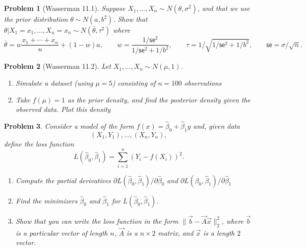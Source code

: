 \documentclass{article}
\newtheorem{problem}{Problem}
\begin{document}
\begin{problem}[Wasserman 11.1]
    Suppose $X_1, \ldots, X_n \sim N(\theta,\sigma^2)$, and that we use the prior distribution $\theta\sim N(a,b^2)$.
    Show that $\theta|X_1=x_1, \ldots, X_n=x_n \sim N(\bar{\theta},\tau^2)$ where 
    \begin{equation*}
        \bar{\theta} = w \frac{x_1+ \cdots + x_n}{n} + (1-w)a
        ,\qquad w = \frac{1/\mathsf{se}^2}{1/\mathsf{se}^2 + 1/b^2}
        ,\qquad \tau = 1/\sqrt{1/\mathsf{se}^2 + 1/b^2}
        ,\qquad \mathsf{se} = \sigma/\sqrt{n}.
    \end{equation*}
\end{problem}

\clearpage
\begin{problem}[Wasserman 11.2]
    Let $X_1, \ldots, X_n\sim N(\mu,1)$.
    \begin{enumerate}[label=(\alph*),topsep=0pt]
        \item Simulate a dataset (using $\mu=5$) consisting of $n=100$ observations
        \item Take $f(\mu) = 1$ as the prior density, and find the posterior density given the observed data. Plot this density
    \end{enumerate}
\end{problem}


\begin{problem}
    Consider a model of the form $f(x) = \hat{\beta}_0 + \hat{\beta}_1 y$ and, given data 
    \begin{equation*}
        (X_1, Y_1), \ldots, (X_n, Y_n),
    \end{equation*}
    define the loss function
    \begin{equation*}
        L(\hat{\beta}_0, \hat{\beta}_1) = \sum_{i=1}^{n} (Y_i - f(X_i))^2. 
    \end{equation*}

    \begin{enumerate}[label=(\alph*),topsep=0pt]
        \item Compute the partial derivatives 
            $\partial L(\hat{\beta}_0,\hat{\beta}_1) / \partial \hat{\beta}_0$
            and $\partial L(\hat{\beta}_0,\hat{\beta}_1) / \partial \hat{\beta}_1$
        \item Find the minimizers $\hat{\beta}_0$ and $\hat{\beta}_1$ for $L(\hat{\beta}_0, \hat{\beta}_1)$.
        \item Show that you can write the loss function in the form $\|\vec{b} - \vec{A}\vec{x}\|_2^2$, where $\vec{b}$ is a particular vector of length $n$, $\vec{A}$ is a $n\times 2$ matrix, and $\vec{x}$ is a length $2$ vector.
    \end{enumerate}

\end{problem}
\end{document}
